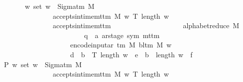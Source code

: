 \begin{isabellebody}
\ \ \ \ \ \ \ {\isachardoublequoteopen}{\isasymforall}w{\isachardot}{\kern0pt}\ set\ w\ {\isasymsubseteq}\ Sigma{\isacharunderscore}{\kern0pt}tm\ M\isanewline
\ \ \ \ \ \ \ \ \ \ \ \ \ \ {\isasymlongrightarrow}\ accepts{\isacharunderscore}{\kern0pt}in{\isacharunderscore}{\kern0pt}time{\isacharunderscore}{\kern0pt}mttm\ M\ w\ {\isacharparenleft}{\kern0pt}T\ {\isacharparenleft}{\kern0pt}length\ w{\isacharparenright}{\kern0pt}{\isacharparenright}{\kern0pt}\isanewline
\ \ \ \ \ \ \ \ \ \ \ \ \ \ {\isasymlongrightarrow}\ accepts{\isacharunderscore}{\kern0pt}in{\isacharunderscore}{\kern0pt}time{\isacharunderscore}{\kern0pt}mttm\isanewline
\ \ \ \ \ \ \ \ \ \ \ \ \ \ \ \ \ \ \ \ {\isacharparenleft}{\kern0pt}alphabet{\isacharunderscore}{\kern0pt}reduce\ M\isanewline
\ \ \ \ \ \ \ \ \ \ \ \ \ \ \ \ \ \ \ \ \ \ \ {\isacharcolon}{\kern0pt}{\isacharcolon}{\kern0pt}\ {\isacharparenleft}{\kern0pt}{\isacharprime}{\kern0pt}q\ {\isasymtimes}\ {\isacharprime}{\kern0pt}a\ ar{\isacharunderscore}{\kern0pt}stage{\isacharcomma}{\kern0pt}\ sym{}{\isacharparenright}{\kern0pt}\ mttm{\isacharparenright}{\kern0pt}\isanewline
\ \ \ \ \ \ \ \ \ \ \ \ \ \ \ \ \ \ \ \ {\isacharparenleft}{\kern0pt}encode{\isacharunderscore}{\kern0pt}input{\isacharunderscore}{\kern0pt}ar\ {\isacharparenleft}{\kern0pt}{\isasymGamma}{\isacharunderscore}{\kern0pt}tm\ M{\isacharparenright}{\kern0pt}\ {\isacharparenleft}{\kern0pt}bl{\isacharunderscore}{\kern0pt}tm\ M{\isacharparenright}{\kern0pt}\ w{\isacharparenright}{\kern0pt}\isanewline
\ \ \ \ \ \ \ \ \ \ \ \ \ \ \ \ \ \ \ \ {\isacharparenleft}{\kern0pt}d\ {\isacharasterisk}{\kern0pt}\ b\ {\isacharasterisk}{\kern0pt}\ T\ {\isacharparenleft}{\kern0pt}length\ w{\isacharparenright}{\kern0pt}\ {\isacharplus}{\kern0pt}\ e\ {\isacharasterisk}{\kern0pt}\ b\ {\isacharasterisk}{\kern0pt}\ length\ w\ {\isacharplus}{\kern0pt}\ f{\isacharparenright}{\kern0pt}{\isachardoublequoteclose}\isanewline
%
\isadelimproof
%
\endisadelimproof
%
\isatagproof
{}\isamarkupfalse%
\ {\isacharminus}{\kern0pt}\isanewline
\ \ \isamarkupfalse%
\ P{\isacharcolon}{\kern0pt}\ {\isachardoublequoteopen}{\isasymforall}w{\isachardot}{\kern0pt}\ set\ w\ {\isasymsubseteq}\ Sigma{\isacharunderscore}{\kern0pt}tm\ M\isanewline
\ \ \ \ \ \ \ \ \ \ \ \ \ \ {\isasymlongrightarrow}\ accepts{\isacharunderscore}{\kern0pt}in{\isacharunderscore}{\kern0pt}time{\isacharunderscore}{\kern0pt}mttm\ M\ w\ {\isacharparenleft}{\kern0pt}T\ {\isacharparenleft}{\kern0pt}length\ w{\isacharparenright}{\kern0pt}{\isacharparenright}{\kern0pt}\isanewline

\end{isabellebody}
